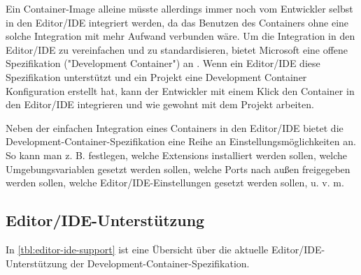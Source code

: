 Ein Container-Image alleine müsste allerdings immer noch vom Entwickler selbst in den Editor/IDE integriert werden, da das Benutzen des Containers ohne eine solche Integration mit mehr Aufwand verbunden wäre. Um die Integration in den Editor/IDE zu vereinfachen und zu standardisieren, bietet Microsoft eine offene Spezifikation ("Development Container") an \cite{DevelopmentContainers}. Wenn ein Editor/IDE diese Spezifikation unterstützt und ein Projekt eine Development Container Konfiguration erstellt hat, kann der Entwickler mit einem Klick den Container in den Editor/IDE integrieren und wie gewohnt mit dem Projekt arbeiten.

Neben der einfachen Integration eines Containers in den Editor/IDE bietet die Development-Container-Spezifikation eine Reihe an Einstellungsmöglichkeiten an. So kann man z. B. festlegen, welche Extensions installiert werden sollen, welche Umgebungsvariablen gesetzt werden sollen, welche Ports nach außen freigegeben werden sollen, welche Editor/IDE-Einstellungen gesetzt werden sollen, u. v. m.

\pagebreak

\subsection{Editor/IDE-Unterstützung}

In \cref{tbl:editor-ide-support} ist eine Übersicht über die aktuelle Editor/IDE-Unterstützung der Development-Container-Spezifikation.


